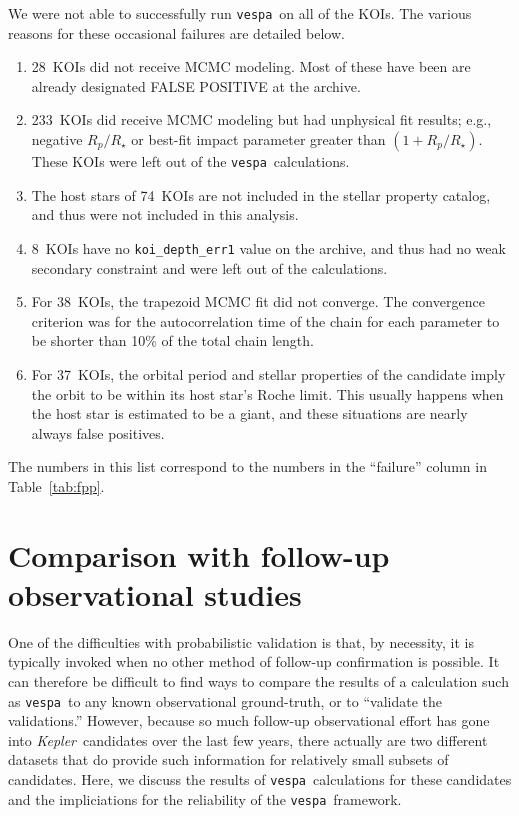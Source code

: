 \documentclass{emulateapj}
\newcommand{\Tab}[1]{Table~\ref{tab:#1}}
\newcommand{\tab}[1]{\Tab{#1}}
\newcommand{\sectlabel}[1]{\label{sect:#1}}
\newcommand{\nbadphot}{28} %
\newcommand{\nbadrowemcmc}{233}
\newcommand{\nbadstellar}{74} %
\newcommand{\nbadsec}{8} %
\newcommand{\nbadtrapfit}{38} %
\newcommand{\nbadroche}{37}
\newcommand{\kepler}{\textit{Kepler}}
\newcommand{\vespa}{\texttt{vespa}}
\begin{document}
We were not able to successfully run \vespa\ on all of the KOIs. The 
various reasons for these occasional failures are detailed below.  
\begin{enumerate}
\item \nbadphot\ KOIs did not receive MCMC modeling.  Most of these
  have been are already designated FALSE POSITIVE at the archive.
\item \nbadrowemcmc\ KOIs did receive MCMC modeling but had unphysical fit
  results; e.g., negative $R_p/R_\star$ or best-fit impact parameter
  greater than $(1 + R_p/R_\star)$.  These KOIs were left out of the 
  \vespa\ calculations.
\item The host stars of \nbadstellar\ KOIs are not included in the
   stellar property catalog, and thus were not
  included in this analysis.
\item \nbadsec\ KOIs have no \verb|koi_depth_err1| value on the archive,
  and thus had no weak secondary constraint and were left out of the
  calculations.
\item For \nbadtrapfit\ KOIs, the trapezoid MCMC fit did not converge.  The
  convergence criterion was for the autocorrelation time of the chain
  for each parameter to be shorter than 10\% of the total chain
  length.
\item For \nbadroche\ KOIs, the orbital period and stellar properties of the 
  candidate imply the orbit to be within its host star's Roche limit.  This
  usually happens when the host star is estimated to be a giant, and
  these situations are nearly always false positives. 
\end{enumerate}
The numbers in this list correspond to the numbers in
the ``failure'' column in \tab{fpp}.  

\section{Comparison with follow-up observational studies}
\sectlabel{comparisons} 

One of the difficulties with probabilistic
validation is that, by necessity, it is typically invoked when no
other method of follow-up confirmation is possible.  It can therefore
be difficult to find ways to compare the results of a calculation such
as \vespa\ to any known observational ground-truth, or to ``validate
the validations.''  However, because so much follow-up observational
effort has gone into \kepler\ candidates over the last few years,
there actually are two different datasets that do provide such
information for relatively small subsets of candidates.  Here, we
discuss the results of \vespa\ calculations for these candidates and
the impliciations for the reliability of the \vespa\ framework.
\end{document}
